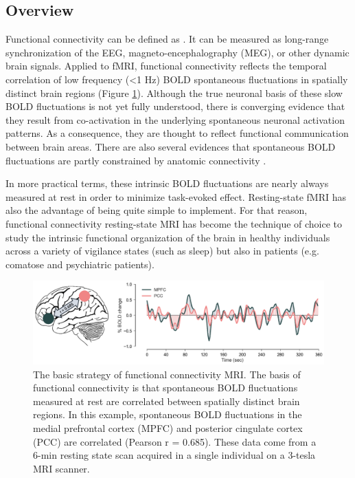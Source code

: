\subsection{Overview}
\label{sec:fmri:fc:overview}

Functional connectivity can be defined as  \citep{van_den_heuvel_exploring_2010}. It can be measured as long-range synchronization of the EEG, magneto-encephalography (MEG), or other dynamic brain signals. Applied to fMRI, functional connectivity reflects the temporal correlation of low frequency (<1 Hz) BOLD spontaneous fluctuations in spatially distinct brain regions (Figure \ref{fig:methods:fcmri}). Although the true neuronal basis of these slow BOLD fluctuations is not yet fully understood, there is converging evidence that they result from co-activation in the underlying spontaneous neuronal activation patterns. As a consequence, they are thought to reflect functional communication between brain areas. There are also several evidences that spontaneous BOLD fluctuations are partly constrained by anatomic connectivity \citep{van_dijk_intrinsic_2010}.

In more practical terms, these intrinsic BOLD fluctuations are nearly always measured at rest in order to minimize task-evoked effect. Resting-state fMRI has also the advantage of being quite simple to implement. For that reason, functional connectivity resting-state MRI has become the technique of choice to study the intrinsic functional organization of the brain in healthy individuals across a variety of vigilance states (such as sleep) but also in patients (e.g. comatose and psychiatric patients).

\begin{figure}[htb]
	\includegraphics[width=\textwidth]{Fig/Methods/fMRI_temporal_correlation/fMRI_temporal_correlation.png}
	\caption[The basic strategy of functional connectivity MRI]{The basic strategy of functional connectivity MRI. The basis of functional connectivity is that spontaneous BOLD fluctuations measured at rest are correlated between spatially distinct brain regions. In this example, spontaneous BOLD fluctuations in the medial prefrontal cortex (MPFC) and posterior cingulate cortex (PCC) are correlated (Pearson r = 0.685). These data come from a 6-min resting state scan acquired in a single individual on a 3-tesla MRI scanner.}
	\label{fig:methods:fcmri}
\end{figure}

